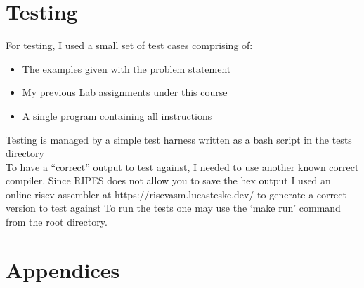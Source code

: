 \documentclass[12pt]{article}
\begin{document}
    \section{Testing}
    For testing, I used a small set of test cases comprising of:
    
	\begin{itemize}
		\item{The examples given with the problem statement}
		\item{My previous Lab assignments under this course}
		\item{A single program containing all instructions}
	\end{itemize}
	
 Testing is managed by a simple test harness written as a bash script in the tests directory\\
	To have a ``correct'' output to test against, I needed to use another known correct compiler. Since RIPES does not allow you to save the hex output I used an online riscv assembler at https://riscvasm.lucasteske.dev/ to generate a correct version to test against
	To run the tests one may use the `make run' command from the root directory.

    \newpage
    \appendix
    \section*{Appendices}
    \renewcommand{\thesubsection}{\Alph{subsection}}
    
\end{document}
